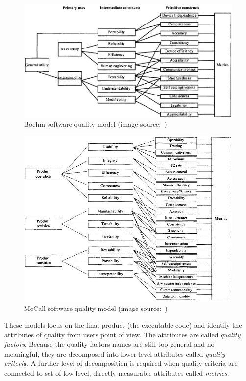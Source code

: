 \begin{figure}[h!]
	\centering
	\includegraphics[scale=0.5]{img/boehm-model.jpg}
	\caption{Boehm software quality model (image source:~\cite{rigorous})}		
	\label{fig:boehmjpg}
\end{figure}


\begin{figure}[h!]
	\centering
	\includegraphics[scale=0.5]{img/mcCall-model.jpg} 
	\caption{McCall software quality model (image source:~\cite{rigorous})}		
	\label{fig:mccalljpg}
\end{figure}

These models focus on the final product (the executable code) and identify the attributes of quality from users point of view. The attributes are called \textit{quality factors}. Because the quality factors names are still too general and no meaningful, they are decomposed into lower-level attributes called \textit{quality criteria}. A further level of decomposition is required when quality criteria are connected to set of low-level, directly measurable attributes called \textit{metrics}. 

